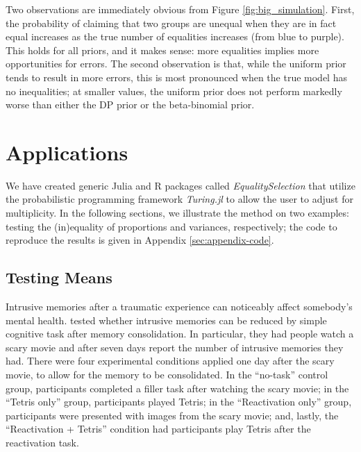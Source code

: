 \documentclass[11pt,a4paper]{article}
\theoremstyle{definition} %
\theoremstyle{case}
\begin{document}
Two observations are immediately obvious from Figure \ref{fig:big_simulation}. First, the probability of claiming that two groups are unequal when they are in fact equal increases as the true number of equalities increases (from blue to purple). This holds for all priors, and it makes sense: more equalities implies more opportunities for errors. The second observation is that, while the uniform prior tends to result in more errors, this is most pronounced when the true model has no inequalities; at smaller values, the uniform prior does not perform markedly worse than either the DP prior or the beta-binomial prior.

\section{Applications} \label{sec:applications}
We have created generic Julia and R packages called \textit{EqualitySelection} that utilize the probabilistic programming framework \textit{Turing.jl} to allow the user to adjust for multiplicity. In the following sections, we illustrate the method on two examples: testing the (in)equality of proportions and variances, respectively; the code to reproduce the results is given in Appendix \ref{sec:appendix-code}.


\iffalse
\subsection{Testing Means}
Intrusive memories after a traumatic experience can noticeably affect somebody's mental health. \textcite{james2015computer} tested whether intrusive memories can be reduced by simple cognitive task after memory consolidation. In particular, they had people watch a scary movie and after seven days report the number of intrusive memories they had. There were four experimental conditions applied one day after the scary movie, to allow for the memory to be consolidated. In the ``no-task'' control group, participants completed a filler task after watching the scary movie; in the ``Tetris only'' group, participants played Tetris; in the ``Reactivation only'' group, participants were presented with images from the scary movie; and, lastly, the ``Reactivation + Tetris'' condition had participants play Tetris after the reactivation task.


\end{document}
